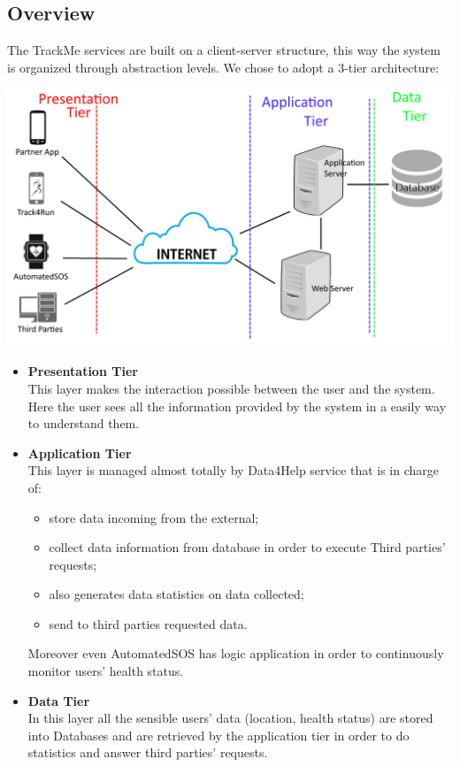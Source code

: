 \subsection{Overview}
The TrackMe services are built on a client-server structure, this way the system is organized through abstraction levels.
We chose to adopt a 3-tier architecture:

\includegraphics[scale=0.2]{Images/Overview.png}

\begin{itemize}
	\item \textbf{Presentation Tier} \\This layer makes the interaction possible between the user and the system. Here the user sees all the information provided by the system in a easily way to understand them.
	\item \textbf{Application Tier} \\This layer is managed almost totally by Data4Help service that is in charge of:
	\begin{itemize}
		\item store data incoming from the external;
		\item collect data information from database in order to execute Third parties’ requests;
		\item also generates data statistics on data collected;
		\item send to third parties requested data.
	\end{itemize}
	Moreover even AutomatedSOS has logic application in order to continuously monitor users’ health status.
	\item \textbf{Data Tier} \\In this layer all the sensible users’ data (location, health status) are stored into Databases and are retrieved by the application tier in order to do statistics and answer third parties’ requests.
\end{itemize}

